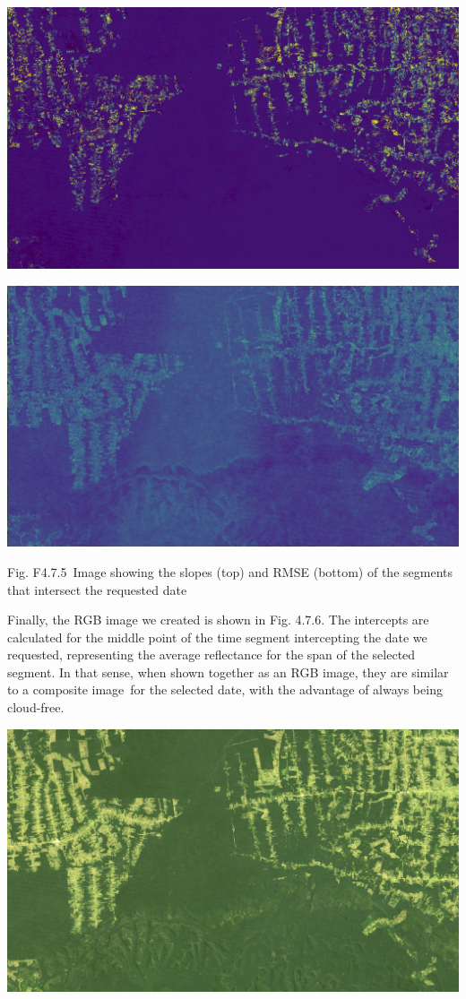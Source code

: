 \documentclass[
  letterpaper,
  DIV=11,
  numbers=noendperiod]{scrreprt}
\begin{document}
\includegraphics{./F4/image18.png}

\includegraphics{./F4/image28.png}

Fig. F4.7.5~Image showing the slopes (top) and RMSE (bottom) of the
segments that intersect the requested date

Finally, the RGB image we created is shown in Fig. 4.7.6. The intercepts
are calculated for the middle point of the time segment intercepting the
date we requested, representing the average reflectance for the span of
the selected segment. In that sense, when shown together as an RGB
image, they are similar to a composite image~for the selected date, with
the advantage of always being cloud-free.

\includegraphics{./F4/image76.png}
\end{document}
